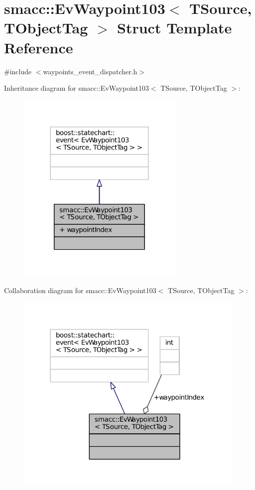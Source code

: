 \hypertarget{structsmacc_1_1EvWaypoint103}{}\section{smacc\+:\+:Ev\+Waypoint103$<$ T\+Source, T\+Object\+Tag $>$ Struct Template Reference}
\label{structsmacc_1_1EvWaypoint103}


{\ttfamily \#include $<$waypoints\+\_\+event\+\_\+dispatcher.\+h$>$}



Inheritance diagram for smacc\+:\+:Ev\+Waypoint103$<$ T\+Source, T\+Object\+Tag $>$\+:
\nopagebreak
\begin{figure}[H]
\begin{center}
\leavevmode
\includegraphics[width=227pt]{structsmacc_1_1EvWaypoint103__inherit__graph}
\end{center}
\end{figure}


Collaboration diagram for smacc\+:\+:Ev\+Waypoint103$<$ T\+Source, T\+Object\+Tag $>$\+:
\nopagebreak
\begin{figure}[H]
\begin{center}
\leavevmode
\includegraphics[width=312pt]{structsmacc_1_1EvWaypoint103__coll__graph}
\end{center}
\end{figure}
